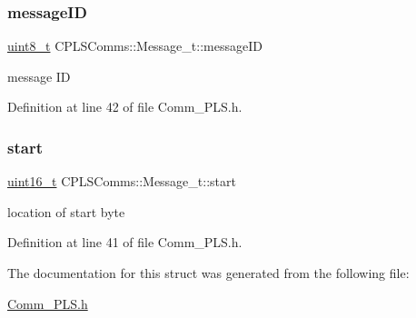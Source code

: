 \subsubsection{\texorpdfstring{message\+ID}{messageID}}
{\footnotesize\ttfamily \mbox{\hyperlink{_a_d_a_s___types_8h_aba7bc1797add20fe3efdf37ced1182c5}{uint8\+\_\+t}} C\+P\+L\+S\+Comms\+::\+Message\+\_\+t\+::message\+ID}

message ID 

Definition at line 42 of file Comm\+\_\+\+P\+L\+S.\+h.

\mbox{\label{struct_c_p_l_s_comms_1_1_message__t_a760e6f39adfed2b0440477560654f02f}} 
\subsubsection{\texorpdfstring{start}{start}}
{\footnotesize\ttfamily \mbox{\hyperlink{_a_d_a_s___types_8h_a1f1825b69244eb3ad2c7165ddc99c956}{uint16\+\_\+t}} C\+P\+L\+S\+Comms\+::\+Message\+\_\+t\+::start}

location of start byte 

Definition at line 41 of file Comm\+\_\+\+P\+L\+S.\+h.



The documentation for this struct was generated from the following file\+:\begin{DoxyCompactItemize}
\item 
\mbox{\hyperlink{_comm___p_l_s_8h}{Comm\+\_\+\+P\+L\+S.\+h}}\end{DoxyCompactItemize}
